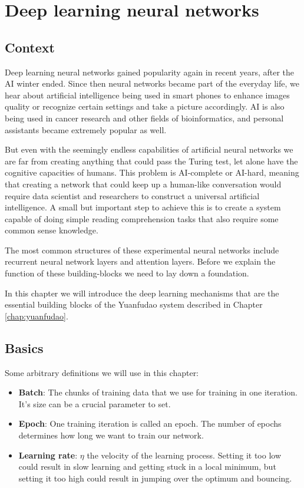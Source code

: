 \chapter{Deep learning neural networks}
\label{chap:deep}
\section{Context}
Deep learning neural networks gained popularity again in recent years, after the AI winter ended. Since then neural networks became part of the everyday life, we hear about artificial intelligence being used in smart phones to enhance images quality or recognize certain settings and take a picture accordingly. AI is also being used in cancer research and other fields of bioinformatics, and personal assistants became extremely popular as well.

But even with the seemingly endless capabilities of artificial neural networks we are far from creating anything that could pass the Turing test, let alone have the cognitive capacities of humans. This problem is AI-complete or AI-hard, meaning that creating a network that could keep up a human-like conversation would require data scientist and researchers to construct a universal artificial intelligence. A small but important step to achieve this is to create a system capable of doing simple reading comprehension tasks that also require some common sense knowledge.

The most common structures of these experimental neural networks include recurrent neural network layers and attention layers. Before we explain the function of these building-blocks we need to lay down a foundation.

In this chapter we will introduce the deep learning mechanisms that are the essential building blocks of the Yuanfudao system described in Chapter \ref{chap:yuanfudao}.

\section{Basics}
Some arbitrary definitions we will use in this chapter:
\begin{itemize}
	\item \textbf{Batch}: The chunks of training data that we use for training in one iteration. It's size can be a crucial parameter to set.
	\item \textbf{Epoch}: One training iteration is called an epoch. The number of epochs determines how long we want to train our network.
	\item \textbf{Learning rate}: \(\eta\) the velocity of the learning process. Setting it too low could result in slow learning and getting stuck in a local minimum, but setting it too high could result in jumping over the optimum and bouncing.
\end{itemize}

